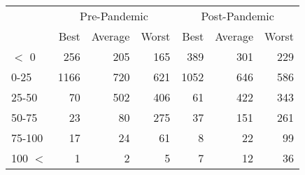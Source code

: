 
\begin{tabular}[t]{lrrrrrr}
\toprule
\multicolumn{1}{c}{ } & \multicolumn{3}{c}{Pre-Pandemic} & \multicolumn{3}{c}{Post-Pandemic} \\
\cmidrule(l{3pt}r{3pt}){2-4} \cmidrule(l{3pt}r{3pt}){5-7}
 & Best & Average & Worst & Best & Average & Worst\\
\midrule
$<$ 0 & 256 & 205 & 165 & 389 & 301 & 229\\
0-25 & 1166 & 720 & 621 & 1052 & 646 & 586\\
25-50 & 70 & 502 & 406 & 61 & 422 & 343\\
50-75 & 23 & 80 & 275 & 37 & 151 & 261\\
75-100 & 17 & 24 & 61 & 8 & 22 & 99\\
100 $<$ & 1 & 2 & 5 & 7 & 12 & 36\\
\bottomrule
\end{tabular}
